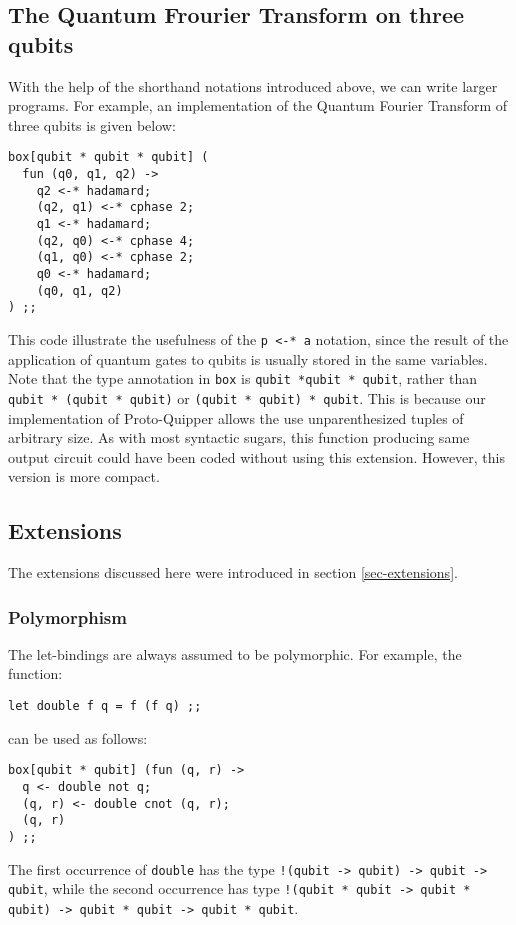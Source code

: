 \subsection{The Quantum Frourier Transform on three qubits}

With the help of the shorthand notations introduced above, we can write 
larger programs. For example, an implementation of the Quantum Fourier 
Transform of three qubits is given below:
\begin{verbatim}
box[qubit * qubit * qubit] (
  fun (q0, q1, q2) ->
    q2 <-* hadamard;
    (q2, q1) <-* cphase 2;
    q1 <-* hadamard;
    (q2, q0) <-* cphase 4;
    (q1, q0) <-* cphase 2;
    q0 <-* hadamard;
    (q0, q1, q2)
) ;;
\end{verbatim}
This code illustrate the usefulness of the \verb#p <-* a# notation, since 
the result of the application of quantum gates to qubits is usually stored 
in the same variables. Note that the type annotation in \verb#box# is 
\verb#qubit *qubit * qubit#, rather than \verb#qubit * (qubit * qubit)# or 
\verb#(qubit * qubit) * qubit#. This is because our implementation of 
Proto-Quipper allows the use unparenthesized tuples of arbitrary size. As 
with most syntactic sugars, this function producing same output circuit 
could have been coded without using this extension. However, this version 
is more compact. 

\subsection{Extensions}

The extensions discussed here were introduced in section 
\hyperref[sec-extensions]{\ref*{sec-extensions}}. 

\subsubsection{Polymorphism}

The let-bindings are always assumed to be polymorphic. For example, the 
function:
\begin{verbatim}
let double f q = f (f q) ;;
\end{verbatim}
can be used as follows:
\begin{verbatim}
box[qubit * qubit] (fun (q, r) ->
  q <- double not q;
  (q, r) <- double cnot (q, r);
  (q, r)
) ;;
\end{verbatim}
The first occurrence of \verb#double# has the type 
\verb#!(qubit -> qubit) -> qubit -> qubit#, while the second occurrence has type 
\verb#!(qubit * qubit -> qubit * qubit) -> qubit * qubit -> qubit * qubit#.


